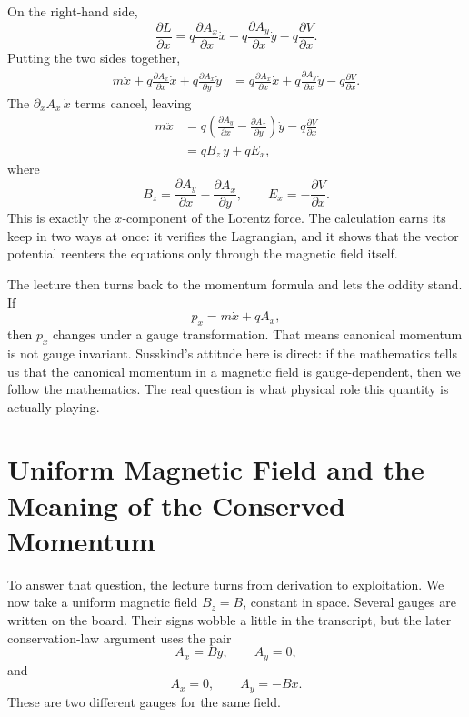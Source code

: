 On the right-hand side,
\begin{equation}
\frac{\partial L}{\partial x}
=
q\frac{\partial A_x}{\partial x}\dot x
+
q\frac{\partial A_y}{\partial x}\dot y
-q\frac{\partial V}{\partial x}.
\end{equation}
Putting the two sides together,
\begin{align}
m\ddot x
+q\frac{\partial A_x}{\partial x}\dot x
+q\frac{\partial A_x}{\partial y}\dot y
&=
q\frac{\partial A_x}{\partial x}\dot x
+
q\frac{\partial A_y}{\partial x}\dot y
-q\frac{\partial V}{\partial x}.
\end{align}
The \(\partial_xA_x\,\dot x\) terms cancel, leaving
\begin{align}
m\ddot x
&=
q\left(\frac{\partial A_y}{\partial x}-\frac{\partial A_x}{\partial y}\right)\dot y
-q\frac{\partial V}{\partial x} \\
&= qB_z\,\dot y+qE_x,
\end{align}
where
\begin{equation}
B_z=\frac{\partial A_y}{\partial x}-\frac{\partial A_x}{\partial y},
\qquad
E_x=-\frac{\partial V}{\partial x}.
\end{equation}
This is exactly the \(x\)-component of the Lorentz force. The calculation earns its keep in two ways at once: it verifies the Lagrangian, and it shows that the vector potential reenters the equations only through the magnetic field itself.

The lecture then turns back to the momentum formula and lets the oddity stand. If
\begin{equation}
p_x=m\dot x+qA_x,
\end{equation}
then \(p_x\) changes under a gauge transformation. That means canonical momentum is not gauge invariant. Susskind's attitude here is direct: if the mathematics tells us that the canonical momentum in a magnetic field is gauge-dependent, then we follow the mathematics. The real question is what physical role this quantity is actually playing.

\section{Uniform Magnetic Field and the Meaning of the Conserved Momentum}

To answer that question, the lecture turns from derivation to exploitation. We now take a uniform magnetic field \(B_z=B\), constant in space. Several gauges are written on the board. Their signs wobble a little in the transcript, but the later conservation-law argument uses the pair
\begin{equation}
A_x=By,\qquad A_y=0,
\end{equation}
and
\begin{equation}
A_x=0,\qquad A_y=-Bx.
\end{equation}
These are two different gauges for the same field.

